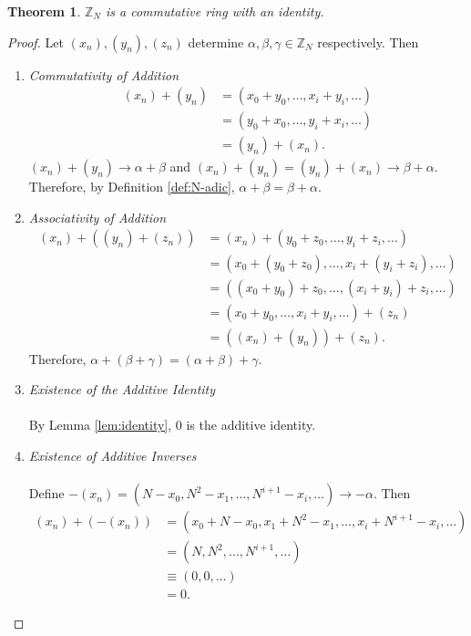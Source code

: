 \documentclass[english]{article}
\def\zzzn{\mathbb{Z}_N}
\def\xn{(x_n)}
\def\yn{(y_n)}
\def\zn{(z_n)}
\theoremstyle{plain}
\newtheorem{theorem}{Theorem}[subsection]
\theoremstyle{definition}
\theoremstyle{remark}
\begin{document}
\begin{theorem}
  $\zzzn$ is a commutative ring with an identity.
\end{theorem}
\begin{proof}
  Let $\xn,\yn,\zn$ determine $\alpha,\beta,\gamma\in\zzzn$ respectively. Then
  \begin{enumerate}
    \item {\em Commutativity of Addition}
      \begin{align*}
            \xn+\yn&=(x_0+y_0,\dots,x_i+y_i,\dots) \\
                   &=(y_0+x_0,\dots,y_i+x_i,\dots) \\
                   &=\yn+\xn.
      \end{align*}
      $\xn+\yn \rightarrow \alpha+\beta$ and $\xn+\yn=\yn+\xn \rightarrow \beta+\alpha$.
      Therefore, by Definition \ref{def:N-adic}, $\alpha+\beta=\beta+\alpha$.
    \item {\em Associativity of Addition}
      \begin{align*}
        \xn+(\yn+\zn)&=\xn+(y_0+z_0,\dots,y_i+z_i,\dots) \\
                     &=(x_0+(y_0+z_0),\dots,x_i+(y_i+z_i),\dots) \\
                     &=((x_0+y_0)+z_0,\dots,(x_i+y_i)+z_i,\dots) \\
                     &=(x_0+y_0,\dots,x_i+y_i,\dots)+\zn \\
                     &=(\xn+\yn)+\zn.
      \end{align*}
      Therefore, $\alpha+(\beta+\gamma)=(\alpha+\beta)+\gamma$.
    \item {\em Existence of the Additive Identity}
      \\ \\
      By Lemma \ref{lem:identity}, $0$ is the additive identity.
    \item {\em Existence of Additive Inverses}
      \\ \\
      Define $-\xn = (N-x_0,N^2-x_1,\dots,N^{i+1}-x_i,\dots) \rightarrow -\alpha$.
      Then
      \begin{align*}
        \xn+(-\xn)&=(x_0+N-x_0,x_1+N^2-x_1,\dots,x_i+N^{i+1}-x_i,\dots) \\
                  &=(N,N^2,\dots,N^{i+1},\dots) \\
                  &\equiv(0,0,\dots) \\
                  &=0.
      \end{align*}

\end{enumerate}
\end{proof}
\end{document}
